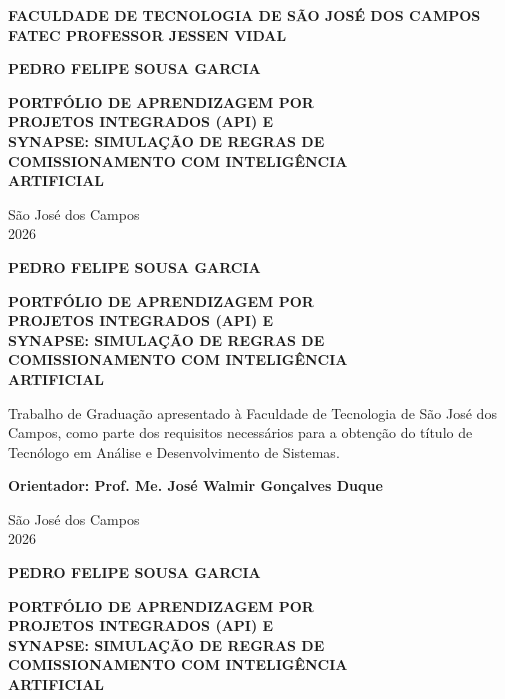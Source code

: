 \documentclass[12pt,a4paper]{article}
\newcommand{\autor}{PEDRO FELIPE SOUSA GARCIA}
\newcommand{\titulotrabalho}{PORTFÓLIO DE APRENDIZAGEM POR\\PROJETOS INTEGRADOS (API) E\\SYNAPSE: SIMULAÇÃO DE REGRAS DE\\COMISSIONAMENTO COM INTELIGÊNCIA\\ARTIFICIAL}
\newcommand{\natureza}{Trabalho de Graduação apresentado à Faculdade de Tecnologia de São José dos Campos, como parte dos requisitos necessários para a obtenção do título de Tecnólogo em Análise e Desenvolvimento de Sistemas.}
\newcommand{\orientador}{Prof. Me. José Walmir Gonçalves Duque}
\newcommand{\ano}{2026}
\begin{document}

\begin{titlepage}
\thispagestyle{empty}
\begin{center}
\textbf{FACULDADE DE TECNOLOGIA DE SÃO JOSÉ DOS CAMPOS}\\
\textbf{FATEC PROFESSOR JESSEN VIDAL}

\vspace*{\fill}
\textbf{\autor}
\vspace*{\fill}

{\fontsize{14}{18}\selectfont\textbf{\titulotrabalho}}

\vspace*{\fill}
\vspace*{\fill}
São José dos Campos\\
\ano
\end{center}
\end{titlepage}
\setcounter{page}{2}

\begin{center}
\textbf{\autor}

\vspace*{\fill}
{\fontsize{14}{18}\selectfont\textbf{\titulotrabalho}}
\vspace*{\fill}
\end{center}

\noindent\hfill\begin{minipage}{8cm}
\singlespacing
\natureza
\end{minipage}

\vspace{2cm}
\noindent\hfill\textbf{Orientador: \orientador}

\vspace*{\fill}
\begin{center}
São José dos Campos\\
\ano
\end{center}
\clearpage

\begin{center}
\textbf{\autor}

\vspace{2cm}
{\fontsize{14}{18}\selectfont\textbf{\titulotrabalho}}
\end{center}
\end{document}
